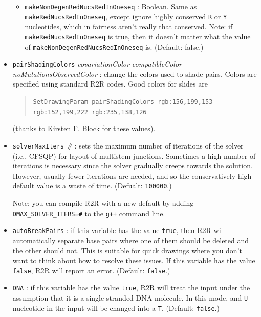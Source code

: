 \documentclass[letterpaper,12pt]{report}
\begin{document}
\begin{itemize}
\begin{itemize}
        \item {\tt makeNonDegenRedNucsRedInOneseq} : Boolean.  Same as {\tt makeRedNucsRedInOneseq}, except ignore highly conserved {\tt R} or {\tt Y} nucleotides, which in fairness aren't really that conserved.  Note: if {\tt makeRedNucsRedInOneseq} is true, then it doesn't matter what the value of {\tt makeNonDegenRedNucsRedInOneseq} is. (Default: false.)
	\end{itemize}
\item {\tt pairShadingColors}  \textit{covariationColor  compatibleColor 
noMutationsObservedColor }: change the colors used to shade pairs. 
Colors are specified using standard R2R codes.  Good colors for slides
are 

\begin{quote}
{\tt SetDrawingParam pairShadingColors rgb:156,199,153 rgb:152,199,222 rgb:235,138,126}
\end{quote}
(thanks to Kirsten F. Block for these values).
\item {\tt solverMaxIters} {\it \#} : sets the maximum number of iterations of the solver (i.e., CFSQP) for 
layout of multistem junctions.  Sometimes a high number of iterations is necessary since the solver gradually
creeps towards the solution.  However, usually fewer iterations are needed, and so the conservatively high default
value is a waste of time.  (Defualt: {\tt 100000}.)

Note: you can compile R2R with a new default by adding {\tt -DMAX\_SOLVER\_ITERS=\#} to the {\tt g++} command
line.
\item {\tt autoBreakPairs} : if this variable has the value {\tt true}, then R2R will automatically 
separate base pairs where one of them should be deleted and the other should not.
This is suitable for quick drawings where you don't want to think about how to resolve these issues.
If this variable has the value {\tt false}, R2R will report an error. (Default: {\tt false}.)
\item {\tt DNA} : if this variable has the value {\tt true}, R2R will treat the input under the assumption that it is a single-stranded DNA molecule.  In this mode, and {\tt U} nucleotide in the input will be changed into a {\tt T}.  (Default: {\tt false}.)
\end{itemize}
\end{document}
